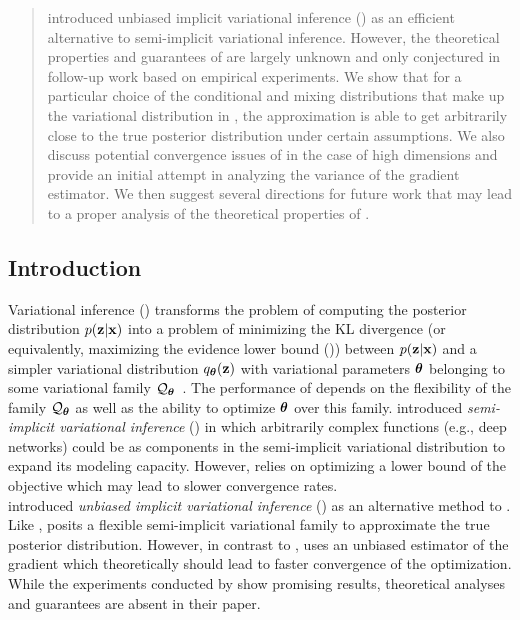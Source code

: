 \documentclass[10pt]{article}
\begin{document}
\vspace{1em}
\begin{abstract}
\citet{Titsias:2019} introduced unbiased implicit variational inference (\uivi) as an efficient alternative to semi-implicit variational inference. However, the theoretical properties and guarantees of \uivi are largely unknown and only conjectured in follow-up work based on empirical experiments. We show that for a particular choice of the conditional and mixing distributions that make up the variational distribution in \uivi, the \uivi approximation is able to get arbitrarily close to the true posterior distribution under certain assumptions. We also discuss potential convergence issues of \uivi in the case of high dimensions and provide an initial attempt in analyzing the variance of the \elbo gradient estimator. We then suggest several directions for future work that may lead to a proper analysis of the theoretical properties of \uivi.
\end{abstract}
\vspace{1em}

\subsection{Introduction} \label{sec:introduction}

Variational inference (\vi) transforms the problem of computing the posterior distribution $p(\mathbf{z}|\mathbf{x})$ into a problem of minimizing the KL divergence (or equivalently, maximizing the evidence lower bound (\elbo)) between $p(\mathbf{z}|\mathbf{x})$ and a simpler variational distribution $q_{\bm{\theta}}(\mathbf{z})$ with variational parameters ${\bm{\theta}}$ belonging to some variational family $\mathcal{Q}_{\bm{\theta}}$~\citep{Jordan:1999}. The performance of \vi depends on the flexibility of the family $\mathcal{Q}_{\bm{\theta}}$ as well as the ability to optimize ${\bm{\theta}}$ over this family. \citet{Yin:2018} introduced \textit{semi-implicit variational inference} (\sivi) in which arbitrarily complex functions (e.g., deep networks) could be as components in the semi-implicit variational distribution to expand its modeling capacity. However, \sivi relies on optimizing a lower bound of the \elbo objective which may lead to slower convergence rates.
\\

\citet{Titsias:2019} introduced \textit{unbiased implicit variational inference} (\uivi) as an alternative method to \sivi. Like \sivi, \uivi posits a flexible semi-implicit variational family to approximate the true posterior distribution. However, in contrast to \sivi, \uivi uses an unbiased estimator of the \elbo gradient which theoretically should lead to faster convergence of the optimization. While the experiments conducted by \citet{Titsias:2019} show promising results, theoretical analyses and guarantees are absent in their paper.
\\
\end{document}
